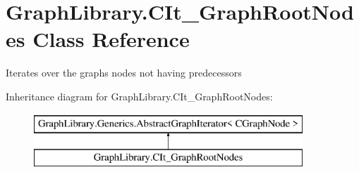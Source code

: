 \hypertarget{class_graph_library_1_1_c_it___graph_root_nodes}{}\section{Graph\+Library.\+C\+It\+\_\+\+Graph\+Root\+Nodes Class Reference}
\label{class_graph_library_1_1_c_it___graph_root_nodes}


Iterates over the graph\textquotesingle{}s nodes not having predecessors  


Inheritance diagram for Graph\+Library.\+C\+It\+\_\+\+Graph\+Root\+Nodes\+:\begin{figure}[H]
\begin{center}
\leavevmode
\includegraphics[height=2.000000cm]{class_graph_library_1_1_c_it___graph_root_nodes}
\end{center}
\end{figure}
